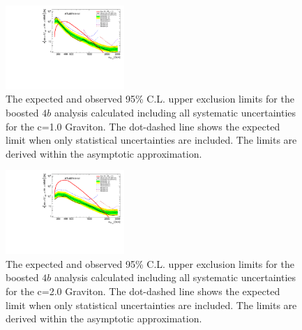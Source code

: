 \begin{figure}
\begin{center}
\includegraphics[width=0.4\textwidth,angle=-90]{figures/boosted/results/BrazilPlot_Asymptotic_g_hh_c10_combined_AllSyst_unblinded_2017-10-04.pdf}
\caption{The expected and observed 95\% C.L. upper exclusion limits for the boosted $4b$ analysis calculated including all systematic uncertainties for the c=1.0 Graviton. The dot-dashed line shows the expected limit when only statistical uncertainties are included. The limits are derived within the asymptotic approximation.}
\label{fig:limit_g20}
\end{center}
\end{figure}
\begin{figure}

\begin{center}
\includegraphics[width=0.4\textwidth,angle=-90]{figures/boosted/results/BrazilPlot_Asymptotic_g_hh_c20_combined_AllSyst_unblinded_2017-10-09.pdf}
\caption{The expected and observed 95\% C.L. upper exclusion limits for the boosted $4b$ analysis calculated including all systematic uncertainties for the c=2.0 Graviton. The dot-dashed line shows the expected limit when only statistical uncertainties are included. The limits are derived within the asymptotic approximation.}
\label{fig:limit_scalar}
\end{center}
\end{figure}
